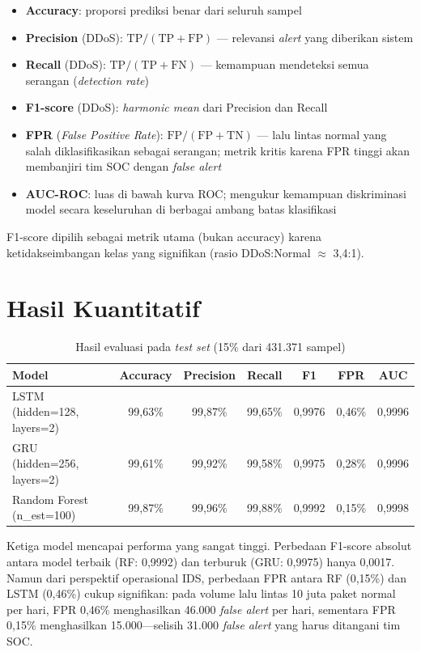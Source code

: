 \documentclass[11pt,a4paper,oneside]{report}
\begin{document}
\begin{itemize}[leftmargin=*]
    \item \textbf{Accuracy}: proporsi prediksi benar dari seluruh sampel
    \item \textbf{Precision} (DDoS): $\text{TP} / (\text{TP} + \text{FP})$ --- relevansi \textit{alert} yang diberikan sistem
    \item \textbf{Recall} (DDoS): $\text{TP} / (\text{TP} + \text{FN})$ --- kemampuan mendeteksi semua serangan (\textit{detection rate})
    \item \textbf{F1-score} (DDoS): \textit{harmonic mean} dari Precision dan Recall
    \item \textbf{FPR} (\textit{False Positive Rate}): $\text{FP} / (\text{FP} + \text{TN})$ --- lalu lintas normal yang salah diklasifikasikan sebagai serangan; metrik kritis karena FPR tinggi akan membanjiri tim SOC dengan \textit{false alert}
    \item \textbf{AUC-ROC}: luas di bawah kurva ROC; mengukur kemampuan diskriminasi model secara keseluruhan di berbagai ambang batas klasifikasi
\end{itemize}

F1-score dipilih sebagai metrik utama (bukan accuracy) karena ketidakseimbangan kelas yang signifikan (rasio DDoS:Normal $\approx$ 3,4:1).

\section{Hasil Kuantitatif}

\begin{table}[h!]
\centering
\caption{Hasil evaluasi pada \textit{test set} (15\% dari 431.371 sampel)}
\label{tab:hasil-utama}
\begin{tabular}{lcccccc}
\toprule
\textbf{Model} & \textbf{Accuracy} & \textbf{Precision} & \textbf{Recall} & \textbf{F1} & \textbf{FPR} & \textbf{AUC} \\
\midrule
LSTM (hidden=128, layers=2) & 99,63\% & 99,87\% & 99,65\% & 0,9976 & 0,46\% & 0,9996 \\
GRU  (hidden=256, layers=2) & 99,61\% & 99,92\% & 99,58\% & 0,9975 & 0,28\% & 0,9996 \\
Random Forest (n\_est=100)  & 99,87\% & 99,96\% & 99,88\% & 0,9992 & 0,15\% & 0,9998 \\
\bottomrule
\end{tabular}
\end{table}

Ketiga model mencapai performa yang sangat tinggi. Perbedaan F1-score absolut antara model terbaik (RF: 0,9992) dan terburuk (GRU: 0,9975) hanya 0,0017. Namun dari perspektif operasional IDS, perbedaan FPR antara RF (0,15\%) dan LSTM (0,46\%) cukup signifikan: pada volume lalu lintas 10 juta paket normal per hari, FPR 0,46\% menghasilkan 46.000 \textit{false alert} per hari, sementara FPR 0,15\% menghasilkan 15.000---selisih 31.000 \textit{false alert} yang harus ditangani tim SOC.
\end{document}
